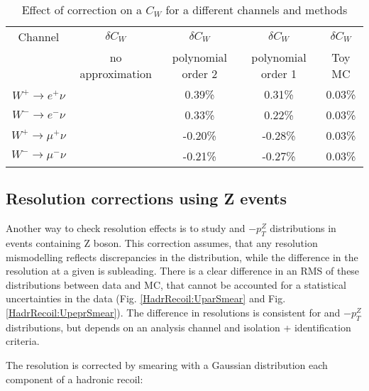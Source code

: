 \begin{table}
 \caption{Effect of \sumet correction on a $C_{W}$ for a different channels and methods}
\label{SumetCW}
\begin{center}
\begin{tabular}{c | c | c |  c |  c   }
\hline
Channel & $\delta C_W$ & $\delta C_W$ & $\delta C_W$ & $\delta C_W$ \\
& no approximation & polynomial order 2 & polynomial order 1 & Toy MC \\
\hline
\hline
$W^{+} \to e^{+}\nu$ & &0.39\%  & 0.31\% & 0.03\% \\
$W^{-} \to e^{-}\nu$ & &0.33\%  & 0.22\% & 0.03\% \\
$W^{+} \to \mu^{+}\nu$ & &-0.20\%  & -0.28\% & 0.03\% \\
$W^{-} \to \mu^{-}\nu$ & &-0.21\%  & -0.27\% & 0.03\% \\
\hline
\end{tabular}
\end{center}

\end{table}


\subsection{Resolution corrections using Z events}\label{sec:ZperpSmear}
Another way to check resolution effects is to study \uperp and \upar  $ - p_T^{Z}$ distributions in events containing Z boson. This correction assumes, that any resolution mismodelling reflects discrepancies in the \sumet distribution, while the difference in the resolution at a given \sumet is subleading. There is a clear difference in an RMS of these distributions between data and MC, that cannot be accounted for a statistical uncertainties in the data (Fig. \ref{HadrRecoil:UparSmear} and Fig. \ref{HadrRecoil:UpeprSmear}). The difference in resolutions is consistent for \uperp and \upar $- p_T^{Z}$ distributions, but depends on an analysis channel and isolation + identification criteria.  

The resolution is corrected by smearing with a Gaussian distribution each component of a hadronic recoil:

